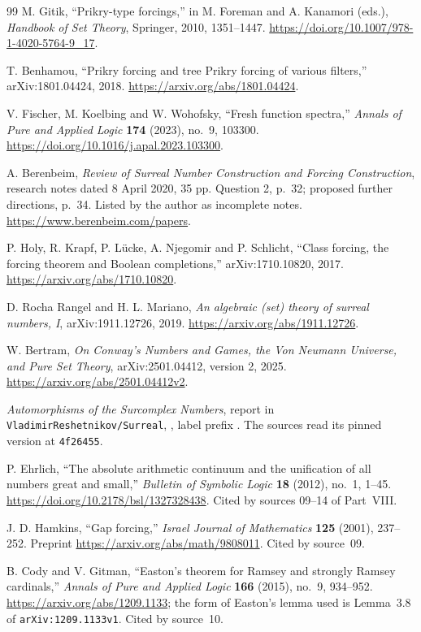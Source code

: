 \documentclass[11pt,letterpaper]{article}
\numberwithin{equation}{section}
\theoremstyle{definition}
\theoremstyle{remark}
\newcommand{\shorthash}{\texttt{4f26455}}
\newcommand{\repo}{\texttt{VladimirReshetnikov/Surreal}}
\begin{document}
\begin{thebibliography}{99}
M. Gitik, ``Prikry-type forcings,'' in M. Foreman and A. Kanamori (eds.),
\emph{Handbook of Set Theory}, Springer, 2010, 1351--1447.
\url{https://doi.org/10.1007/978-1-4020-5764-9_17}.

T. Benhamou, ``Prikry forcing and tree Prikry forcing of various filters,''
arXiv:1801.04424, 2018. \url{https://arxiv.org/abs/1801.04424}.

V. Fischer, M. Koelbing and W. Wohofsky, ``Fresh function spectra,''
\emph{Annals of Pure and Applied Logic} \textbf{174} (2023), no.~9, 103300.
\url{https://doi.org/10.1016/j.apal.2023.103300}.

A. Berenbeim, \emph{Review of Surreal Number Construction and Forcing
Construction}, research notes dated 8 April 2020, 35 pp. Question 2, p.~32;
proposed further directions, p.~34. Listed by the author as incomplete notes.
\url{https://www.berenbeim.com/papers}.

P. Holy, R. Krapf, P. L\"ucke, A. Njegomir and P. Schlicht, ``Class forcing,
the forcing theorem and Boolean completions,'' arXiv:1710.10820, 2017.
\url{https://arxiv.org/abs/1710.10820}.

D. Rocha Rangel and H. L. Mariano, \emph{An algebraic (set) theory of surreal
numbers, I}, arXiv:1911.12726, 2019. \url{https://arxiv.org/abs/1911.12726}.

W. Bertram, \emph{On Conway's Numbers and Games, the Von Neumann Universe, and
Pure Set Theory}, arXiv:2501.04412, version 2, 2025.
\url{https://arxiv.org/abs/2501.04412v2}.

\emph{Automorphisms of the Surcomplex Numbers}, report in \repo,
, label prefix
. The sources read its pinned version at \shorthash.

P. Ehrlich, ``The absolute arithmetic continuum and the unification of all
numbers great and small,'' \emph{Bulletin of Symbolic Logic} \textbf{18} (2012),
no.~1, 1--45. \url{https://doi.org/10.2178/bsl/1327328438}. Cited by sources
09--14 of Part~VIII.

J. D. Hamkins, ``Gap forcing,'' \emph{Israel Journal of Mathematics}
\textbf{125} (2001), 237--252. Preprint \url{https://arxiv.org/abs/math/9808011}.
Cited by source~09.

B. Cody and V. Gitman, ``Easton's theorem for Ramsey and strongly Ramsey
cardinals,'' \emph{Annals of Pure and Applied Logic} \textbf{166} (2015),
no.~9, 934--952. \url{https://arxiv.org/abs/1209.1133}; the form of Easton's
lemma used is Lemma~3.8 of \texttt{arXiv:1209.1133v1}. Cited by source~10.


\end{thebibliography}
\end{document}
